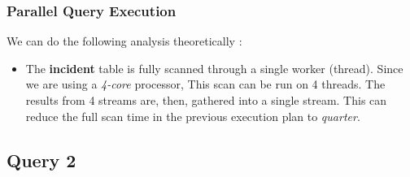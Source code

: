 \subsubsection{Parallel Query Execution}
We can do the following analysis theoretically :
\begin{itemize}
    \item The \textbf{incident} table is fully scanned through a single worker (thread). Since we are using a \emph{4-core} processor, This scan can be run on 4 threads. The results from 4 streams are, then, gathered into a single stream. This can reduce the full scan time in the previous execution plan to \emph{quarter}.  
\end{itemize}

\subsection{Query 2}

